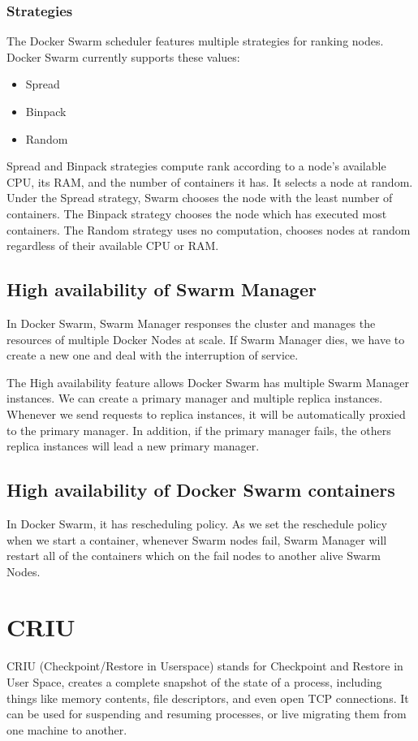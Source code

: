 \subsubsection{Strategies}
The Docker Swarm scheduler features multiple strategies for ranking nodes. Docker Swarm currently supports these values:
\begin{itemize}
    \item Spread
    \item Binpack
    \item Random
\end{itemize}
Spread and Binpack strategies compute rank according to a node’s available CPU, its RAM, and the number of containers it has. It selects a node at random.
Under the Spread strategy, Swarm chooses the node with the least number of containers.
The Binpack strategy chooses the node which has executed most containers.
The Random strategy uses no computation, chooses nodes at random regardless of their available CPU or RAM.

\subsection{High availability of Swarm Manager}
In Docker Swarm, Swarm Manager responses the cluster and manages the resources of multiple Docker Nodes at scale. If Swarm Manager dies, we have to create a new one and deal with the interruption of service.

The High availability feature allows Docker Swarm has multiple Swarm Manager instances. We can create a primary manager and multiple replica instances.
Whenever we send requests to replica instances, it will be automatically proxied to the primary manager.
In addition, if the primary manager fails, the others replica instances will lead a new primary manager.

\subsection{High availability of Docker Swarm containers}
In Docker Swarm, it has rescheduling policy. As we set the reschedule policy when we start a container, whenever Swarm nodes fail, Swarm Manager will restart all of the containers which on the fail nodes to another alive Swarm Nodes.

\section{CRIU}
CRIU \cite{CRIU} (Checkpoint/Restore in Userspace) stands for Checkpoint and Restore in User Space, creates a complete snapshot of the state of a process, including things like memory contents, file descriptors, and even open TCP connections. It can be used for suspending and resuming processes, or live migrating them from one machine to another.

